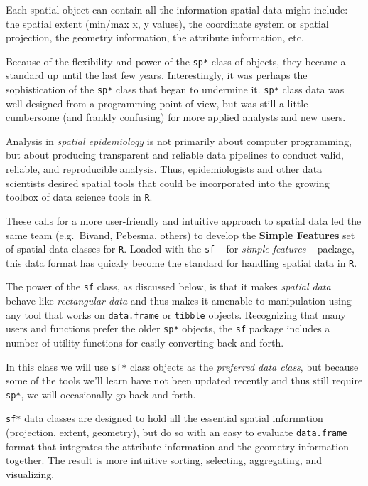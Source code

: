 \documentclass[
]{book}
\newenvironment{rmdnote}[1]
  {
  \begin{itemize}
  \renewcommand{\labelitemi}{
    \raisebox{-.7\height}[0pt][0pt]{
      {\setkeys{Gin}{width=3em,keepaspectratio}\texttt{[image: images/\#1]}}
    }
  }
  \setlength{\fboxsep}{1em}
  \begin{note}
  \item
  }
  {
  \end{note}
  \end{itemize}
  }
\begin{document}
Each spatial object can contain all the information spatial data might include: the spatial extent (min/max x, y values), the coordinate system or spatial projection, the geometry information, the attribute information, etc.

Because of the flexibility and power of the \texttt{sp*} class of objects, they became a standard up until the last few years. Interestingly, it was perhaps the sophistication of the \texttt{sp*} class that began to undermine it. \texttt{sp*} class data was well-designed from a programming point of view, but was still a little cumbersome (and frankly confusing) for more applied analysts and new users.

Analysis in \emph{spatial epidemiology} is not primarily about computer programming, but about producing transparent and reliable data pipelines to conduct valid, reliable, and reproducible analysis. Thus, epidemiologists and other data scientists desired spatial tools that could be incorporated into the growing toolbox of data science tools in \texttt{R}.

These calls for a more user-friendly and intuitive approach to spatial data led the same team (e.g.~Bivand, Pebesma, others) to develop the \textbf{Simple Features} set of spatial data classes for \texttt{R}. Loaded with the \texttt{sf} -- for \emph{simple features} -- package, this data format has quickly become the standard for handling spatial data in \texttt{R}.

The power of the \texttt{sf} class, as discussed below, is that it makes \emph{spatial data} behave like \emph{rectangular data} and thus makes it amenable to manipulation using any tool that works on \texttt{data.frame} or \texttt{tibble} objects. Recognizing that many users and functions prefer the older \texttt{sp*} objects, the \texttt{sf} package includes a number of utility functions for easily converting back and forth.

\begin{rmdnote}{note}
In this class we will use \texttt{sf*} class objects as the \emph{preferred data class}, but because some of the tools we'll learn have not been updated recently and thus still require \texttt{sp*}, we will occasionally go back and forth.

\end{rmdnote}

\texttt{sf*} data classes are designed to hold all the essential spatial information (projection, extent, geometry), but do so with an easy to evaluate \texttt{data.frame} format that integrates the attribute information and the geometry information together. The result is more intuitive sorting, selecting, aggregating, and visualizing.
\end{document}
